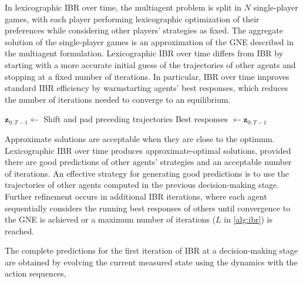 In lexicographic IBR over time, the multiagent problem is split in \(N\)
single-player games, with each player performing lexicographic
optimization of their preferences while considering other players'
strategies as fixed.
The aggregate solution of the single-player games
is an approximation of the GNE
described in the multiagent formulation.
Lexicographic IBR over time differs from IBR by starting with a more accurate initial guess of the
trajectories of other agents and stopping at a fixed number of iterations.
In particular, IBR over time improves standard IBR efficiency
by warmstarting agents' best responses, which reduces the number of iterations needed
to converge to an equilibrium.

\begin{algorithm}
\medskip
$\mathbf{z}_{0:T-1} \gets$ Shift and pad preceding trajectories\;
Best responses $\gets \mathbf{z}_{0:T-1}$\;
\caption{A single IBR solution in games of ordered preference.}
\label{alg:ibr}
\end{algorithm}

Approximate solutions are acceptable when they are close to the optimum.
Lexicographic IBR over time produces approximate-optimal solutions, provided there are good predictions
of other agents' strategies and an acceptable number of iterations.
An effective strategy for generating good predictions is
to use the trajectories of other agents computed
in the previous decision-making stage.
Further refinement occurs in additional IBR iterations, where each agent sequentially considers the running best responses
of others until convergence to the GNE is achieved or a maximum number of iterations (\(L\) in \cref{alg:ibr}) is reached.

The complete predictions for the first iteration of IBR at a decision-making stage
are obtained by evolving the current measured state
using the dynamics with the action sequences,

